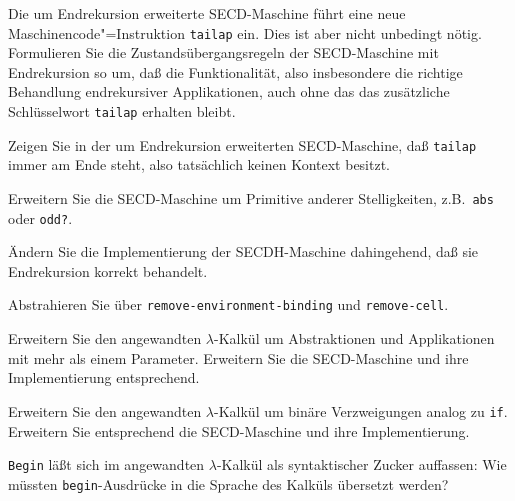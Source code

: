 \begin{aufgabe}
  Die um Endrekursion erweiterte SECD-Maschine führt eine neue
  Maschinencode"=Instruktion \texttt{tailap} ein.  Dies ist aber nicht
  unbedingt nötig.  Formulieren Sie die Zustandsübergangsregeln der
  SECD-Maschine mit Endrekursion so um, daß die Funktionalität, also
  insbesondere die richtige Behandlung endrekursiver Applikationen,
  auch ohne das das zusätzliche Schlüsselwort \texttt{tailap}
  erhalten bleibt.
\end{aufgabe}

\begin{aufgabe}
  Zeigen Sie in der um Endrekursion erweiterten
  SECD-Maschine, daß \texttt{tailap} immer am Ende steht, also
  tatsächlich keinen Kontext besitzt.
\end{aufgabe}

\begin{aufgabe}\label{aufgabe:prim-arity}
  Erweitern Sie die SECD-Maschine um Primitive anderer Stelligkeiten,
  z.B.\ \texttt{abs} oder \texttt{odd?}.
\end{aufgabe}

\begin{aufgabe}
  Ändern Sie die Implementierung der SECDH-Maschine dahingehend, daß
  sie Endrekursion korrekt behandelt.
\end{aufgabe}

\begin{aufgabe}
  Abstrahieren Sie über \texttt{remove-environment-binding} und
  \texttt{remove-cell}.
\end{aufgabe}

\begin{aufgabe}
  Erweitern Sie den angewandten $\lambda$-Kalkül um Abstraktionen und
  Applikationen mit mehr als einem Parameter.  Erweitern Sie die
  SECD-Maschine und ihre Implementierung entsprechend.
\end{aufgabe}


\begin{aufgabe}
  Erweitern Sie den angewandten $\lambda$-Kalkül um binäre
  Verzweigungen analog zu \texttt{if}.  Erweitern Sie entsprechend die
  SECD-Maschine und ihre Implementierung.
\end{aufgabe}

\begin{aufgabe}
  \texttt{Begin} läßt sich im angewandten $\lambda$-Kalkül als
  syntaktischer Zucker auffassen: Wie müssten \texttt{begin}-Ausdrücke
  in die Sprache des Kalküls übersetzt werden?
\end{aufgabe}

